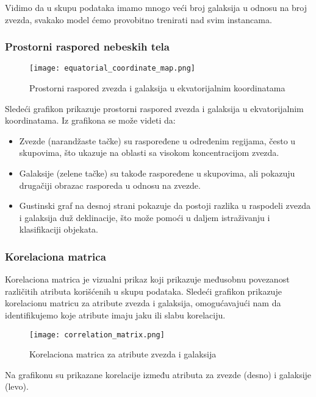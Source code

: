 \documentclass[a4paper,12pt]{article}
\begin{document}
Vidimo da u skupu podataka imamo mnogo veći broj galaksija u odnosu na broj zvezda, svakako model ćemo provobitno trenirati nad svim instancama.

\subsubsection{Prostorni raspored nebeskih tela}

\begin{figure}[h!]
\centering
\texttt{[image: equatorial\_coordinate\_map.png]}
\caption{Prostorni raspored zvezda i galaksija u ekvatorijalnim koordinatama}
\label{fig:equatorial_coordinates}
\end{figure}

Sledeći grafikon prikazuje prostorni raspored zvezda i galaksija u ekvatorijalnim koordinatama. Iz grafikona se može videti da:

\begin{itemize}
    \item Zvezde (narandžaste tačke) su raspoređene u određenim regijama, često u skupovima, što ukazuje na oblasti sa visokom koncentracijom zvezda.
    \item Galaksije (zelene tačke) su takođe raspoređene u skupovima, ali pokazuju drugačiji obrazac rasporeda u odnosu na zvezde.
    \item Gustinski graf na desnoj strani pokazuje da postoji razlika u raspodeli zvezda i galaksija duž deklinacije, što može pomoći u daljem istraživanju i klasifikaciji objekata.
\end{itemize}

\subsubsection{Korelaciona matrica}

Korelaciona matrica je vizualni prikaz koji prikazuje međusobnu povezanost različitih atributa korišćenih u skupu podataka. Sledeći grafikon prikazuje korelacionu matricu za atribute zvezda i galaksija, omogućavajući nam da identifikujemo koje atribute imaju jaku ili slabu korelaciju.

\begin{figure}[h!]
\centering
\texttt{[image: correlation\_matrix.png]}
\caption{Korelaciona matrica za atribute zvezda i galaksija}
\label{fig:correlation_matrix}
\end{figure}

Na grafikonu su prikazane korelacije između atributa za zvezde (desno) i galaksije (levo).
\end{document}
